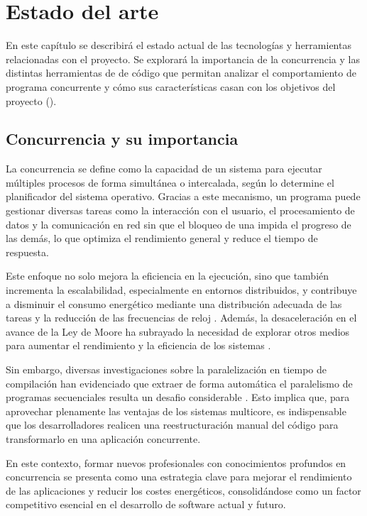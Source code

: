 \chapter{Estado del arte}\label{chap:estado-del-arte}
En este capítulo se describirá el estado actual de las tecnologías y herramientas relacionadas con el proyecto. Se explorará la importancia de la concurrencia y las distintas herramientas de  de código que permitan analizar el comportamiento de \gls{programa concurrente} y cómo sus características casan con los objetivos del proyecto ().

\section{Concurrencia y su importancia}\label{sec:concurrencia-importancia}

La \gls{concurrencia} \cite{ParallelismComputerArchitecture} se define como la capacidad de un sistema para ejecutar múltiples \glspl{proceso} de forma simultánea o intercalada, según lo determine el \gls{planificador} del sistema operativo. Gracias a este mecanismo, un programa puede gestionar diversas tareas como la interacción con el usuario, el procesamiento de datos y la comunicación en red sin que el bloqueo de una impida el progreso de las demás, lo que optimiza el rendimiento general y reduce el tiempo de respuesta.

Este enfoque no solo mejora la eficiencia en la ejecución, sino que también incrementa la escalabilidad, especialmente en entornos distribuidos, y contribuye a disminuir el consumo energético mediante una distribución adecuada de las tareas y la reducción de las frecuencias de reloj \cite{EnergyEfficiencyParallelAplications}. Además, la desaceleración en el avance de la Ley de Moore \cite{LeyMoore} ha subrayado la necesidad de explorar otros medios para aumentar el rendimiento y la eficiencia de los sistemas \cite{ParallelProgramming}.

Sin embargo, diversas investigaciones sobre la paralelización en \gls{tiempo de compilación} han evidenciado que extraer de forma automática el \gls{paralelismo} de programas secuenciales resulta un desafio considerable \cite{ParallelProgramming}. Esto implica que, para aprovechar plenamente las ventajas de los \gls{sistemas multicore}, es indispensable que los desarrolladores realicen una reestructuración manual del código para transformarlo en una aplicación concurrente.

En este contexto, formar nuevos profesionales con conocimientos profundos en \gls{concurrencia} se presenta como una estrategia clave para mejorar el rendimiento de las aplicaciones y reducir los costes energéticos, consolidándose como un factor competitivo esencial en el desarrollo de \gls{software} actual y futuro.


